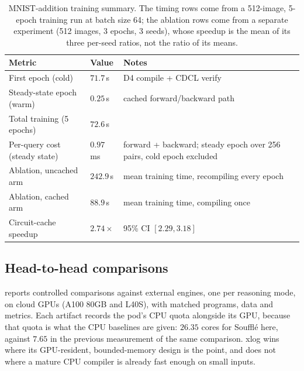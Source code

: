 \begin{table}[htbp]
  \centering
  \caption{MNIST-addition training summary. The timing rows come from a 512-image, 5-epoch training run at batch size 64; the ablation rows come from a separate experiment (512 images, 3 epochs, 3 seeds), whose speedup is the mean of its three per-seed ratios, not the ratio of its means.}
  \label{tab:training-summary}
  \small
  \begin{tabularx}{\linewidth}{@{}l l L@{}}
    \toprule
    \textbf{Metric} & \textbf{Value} & \textbf{Notes} \\
    \midrule
    First epoch (cold)         & $71.7$\,s  & D4 compile + CDCL verify \\
    Steady-state epoch (warm)  & $0.25$\,s  & cached forward/backward path \\
    Total training (5 epochs)  & $72.6$\,s  & \\
    Per-query cost (steady state) & $0.97$\,ms & forward + backward; steady epoch over 256 pairs, cold epoch excluded \\
    \addlinespace
    Ablation, uncached arm     & $242.9$\,s & mean training time, recompiling every epoch \\
    Ablation, cached arm       & $88.9$\,s  & mean training time, compiling once \\
    Circuit-cache speedup      & $2.74\times$ & 95\% CI $[2.29, 3.18]$ \\
    \bottomrule
  \end{tabularx}
\end{table}

\subsection{Head-to-head comparisons}\label{sec:h2h}

 reports controlled comparisons against external engines, one per reasoning mode, on cloud GPUs (A100 80GB and L40S), with matched programs, data and metrics. Each artifact records the pod's CPU quota alongside its GPU, because that quota is what the CPU baselines are given: $26.35$ cores for Soufflé here, against $7.65$ in the previous measurement of the same comparison. xlog wins where its GPU-resident, bounded-memory design is the point, and does not where a mature CPU compiler is already fast enough on small inputs.

